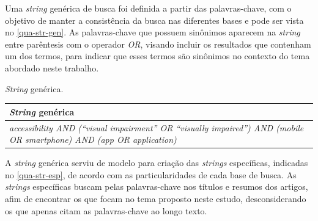 Uma \emph{string} genérica de busca foi definida a partir das palavras-chave, com o objetivo de manter a consistência da busca nas diferentes bases e pode ser vista no \autoref{qua-str-gen}.
As palavras-chave que possuem sinônimos aparecem na \emph{string} entre parêntesis com o operador \emph{OR}, visando incluir os resultados que contenham um dos termos, para indicar que esses termos são sinônimos no contexto do tema abordado neste trabalho.

\begin{quadro}[htb]
  \caption{\label{qua-str-gen}\emph{String} genérica.}
  \begin{tabular}{|m{11.5cm}|}
    \hline
    \textbf{\emph{String} genérica}                                                                                           \\
    \hline
    \emph{accessibility AND (“visual impairment” OR “visually impaired”) AND (mobile OR smartphone) AND (app OR application)} \\ \hline
  \end{tabular}
\end{quadro}

A \emph{string} genérica serviu de modelo para criação das \emph{strings} específicas, indicadas no \autoref{qua-str-esp}, de acordo com as particularidades de cada base de busca.
As \emph{strings} específicas buscam pelas palavras-chave nos títulos e resumos dos artigos, afim de encontrar os que focam no tema proposto neste estudo, desconsiderando os que apenas citam as palavras-chave ao longo texto.

